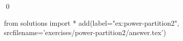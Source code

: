 
\begin{ex} 
  \label{ex:power-partition2}
  
  \qed
\end{ex} 
\begin{python0}
from solutions import *
add(label="ex:power-partition2",
    srcfilename='exercises/power-partition2/answer.tex') 
\end{python0}
